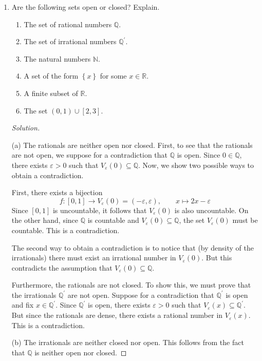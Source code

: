 \documentclass[12pt, reqno]{article}
\numberwithin{equation}{section}
\theoremstyle{definition}
\theoremstyle{remark}
\newcommand{\NN}{\mathbb{N}}
\newcommand{\QQ}{\mathbb{Q}}
\newcommand{\RR}{\mathbb{R}}
\newcommand{\set}[1]{\left\{#1\right\}}
\renewcommand{\epsilon}{\varepsilon}
\begin{document}
\begin{enumerate}[leftmargin=*]
	\item Are the following sets open or closed? Explain.
	      \begin{enumerate}[label=(\alph*)]
		      \item The set of rational numbers $\QQ$.
		      \item The set of irrational numbers $\QQ^\prime$.
		      \item The natural numbers $\NN$.
		      \item A set of the form $\set{x}$ for some $x\in \RR$.
		      \item A finite subset of $\RR$.
		      \item The set $(0,1) \cup [2, 3]$.
	      \end{enumerate}
	      \begin{proof}[Solution]$\,$

		      \hspace{0.5cm} (a) The rationals are neither open nor closed. First, to see that the rationals are not open, we suppose for a contradiction that $\QQ$ is open. Since $0\in\QQ$, there exists $\epsilon > 0$ such that $V_\epsilon(0)\subseteq \QQ$. Now, we show two possible ways to obtain a contradiction.

		      First, there exists a bijection
		      \[
			      f: [0,1] \to V_\epsilon(0) = (-\epsilon, \epsilon), \qquad
			      x\mapsto 2x - \epsilon
		      \]
		      Since $[0,1]$ is uncountable, it follows that $V_\epsilon(0)$ is also uncountable. On the other hand, since $\QQ$ is countable and $V_\epsilon(0) \subseteq \QQ$, the set $V_\epsilon(0)$ must be countable. This is a contradiction.

		      The second way to obtain a contradiction is to notice that (by density of the irrationals) there must exist an irrational number in $V_\epsilon(0)$. But this contradicts the assumption that $V_\epsilon(0)\subseteq \QQ$.

		      Furthermore, the rationals are not closed. To show this, we must prove that the irrationals $\QQ^\prime$ are not open. Suppose for a contradiction that $\QQ^\prime$ is open and fix $x\in \QQ^\prime$. Since $\QQ^\prime$ is open, there exists $\epsilon > 0$ such that $V_\epsilon(x) \subseteq \QQ^\prime$. But since the rationals are dense, there exists a rational number in $V_\epsilon(x)$. This is a contradiction.


		      \hspace{0.5cm}  (b) The irrationals are neither closed nor open. This follows from the fact that $\QQ$ is neither open nor closed.


\end{proof}
\end{enumerate}
\end{document}
